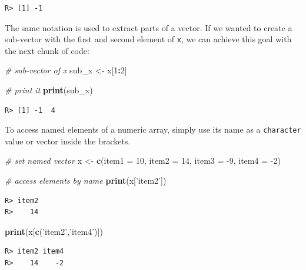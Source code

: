 \documentclass[
  12pt,
]{book}
\newenvironment{Shaded}{\begin{snugshade}}{\end{snugshade}}
\newcommand{\CommentTok}[1]{\textcolor[rgb]{0.37,0.37,0.37}{\textit{#1}}}
\newcommand{\DataTypeTok}[1]{\textcolor[rgb]{0.27,0.27,0.27}{#1}}
\newcommand{\DecValTok}[1]{\textcolor[rgb]{0.06,0.06,0.06}{#1}}
\newcommand{\KeywordTok}[1]{\textcolor[rgb]{0.27,0.27,0.27}{\textbf{#1}}}
\newcommand{\NormalTok}[1]{#1}
\newcommand{\OperatorTok}[1]{\textcolor[rgb]{0.43,0.43,0.43}{\textbf{#1}}}
\newcommand{\StringTok}[1]{\textcolor[rgb]{0.5,0.5,0.5}{#1}}
\begin{document}
\begin{verbatim}
R> [1] -1
\end{verbatim}

The same notation is used to extract parts of a vector. If we wanted to create a sub-vector with the first and second element of \texttt{x}, we can achieve this goal with the next chunk of code:

\begin{Shaded}
\begin{Highlighting}[]
\CommentTok{# sub-vector of x}
\NormalTok{sub_x <-}\StringTok{ }\NormalTok{x[}\DecValTok{1}\OperatorTok{:}\DecValTok{2}\NormalTok{]}

\CommentTok{# print it}
\KeywordTok{print}\NormalTok{(sub_x)}
\end{Highlighting}
\end{Shaded}

\begin{verbatim}
R> [1] -1  4
\end{verbatim}

To access named elements of a numeric array, simply use its name as a \texttt{character} value or vector inside the brackets.

\begin{Shaded}
\begin{Highlighting}[]
\CommentTok{# set named vector}
\NormalTok{x <-}\StringTok{ }\KeywordTok{c}\NormalTok{(}\DataTypeTok{item1 =} \DecValTok{10}\NormalTok{, }\DataTypeTok{item2 =} \DecValTok{14}\NormalTok{, }\DataTypeTok{item3 =} \DecValTok{-9}\NormalTok{, }\DataTypeTok{item4 =} \DecValTok{-2}\NormalTok{)}

\CommentTok{# access elements by name}
\KeywordTok{print}\NormalTok{(x[}\StringTok{'item2'}\NormalTok{])}
\end{Highlighting}
\end{Shaded}

\begin{verbatim}
R> item2 
R>    14
\end{verbatim}

\begin{Shaded}
\begin{Highlighting}[]
\KeywordTok{print}\NormalTok{(x[}\KeywordTok{c}\NormalTok{(}\StringTok{'item2'}\NormalTok{,}\StringTok{'item4'}\NormalTok{)])}
\end{Highlighting}
\end{Shaded}

\begin{verbatim}
R> item2 item4 
R>    14    -2
\end{verbatim}
\end{document}
